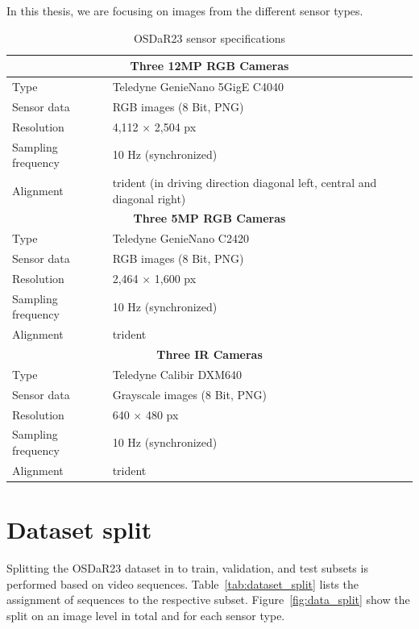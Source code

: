 \documentclass[Master,MDS,english]{BASE/twbook} %
\begin{document}
In this thesis, we are focusing on images from the different sensor types. 

\begin{table}[htbp]
  \centering
  \footnotesize
  \begin{tabular}{|l|l|}
    \hline
    \multicolumn{2}{|c|}{\textbf{Three 12MP RGB Cameras}}  \\
    \hline
    Type & Teledyne GenieNano 5GigE C4040  \\
    Sensor data & RGB images (8 Bit, PNG)  \\
    Resolution & 4,112 $\times$ 2,504 px  \\
    Sampling frequency & 10 Hz (synchronized)  \\
    Alignment & trident (in driving direction diagonal left, central and diagonal right)  \\
    \hline
    \multicolumn{2}{|c|}{\textbf{Three 5MP RGB Cameras}}  \\
    \hline
    Type & Teledyne GenieNano C2420  \\
    Sensor data & RGB images (8 Bit, PNG)  \\
    Resolution & 2,464 $\times$ 1,600 px \\
    Sampling frequency & 10 Hz (synchronized)  \\
    Alignment & trident  \\
    \hline
    \multicolumn{2}{|c|}{\textbf{Three IR Cameras}}  \\
    \hline
    Type & Teledyne Calibir DXM640  \\
    Sensor data & Grayscale images (8 Bit, PNG)  \\
    Resolution & 640 $\times$ 480 px  \\
    Sampling frequency & 10 Hz (synchronized)  \\
    Alignment & trident  \\
    \hline
  \end{tabular}
  \caption{OSDaR23 sensor specifications}
  \label{tab:cameras}
\end{table}



\section{Dataset split} \label{app:data_split}

Splitting the OSDaR23 dataset in to train, validation, and test subsets is performed based on video sequences. Table~\ref{tab:dataset_split} lists the assignment of sequences to the respective subset. Figure~\ref{fig:data_split} show the split on an image level in total and for each sensor type.
\end{document}
